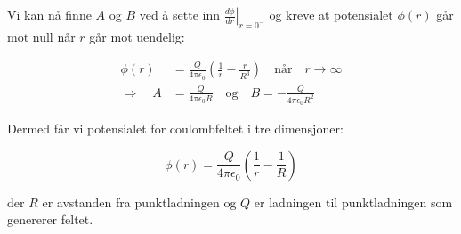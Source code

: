 Vi kan nå finne $A$ og $B$ ved å sette inn $\left.\frac{d\phi}{dr}\right|_{r=0^-}$ og kreve at potensialet $\phi(r)$ går mot null når $r$ går mot uendelig:
    
\begin{align*}
    \phi(r) &= \frac{Q}{4\pi\epsilon_0}\left(\frac{1}{r} - \frac{r}{R^3}\right) \quad \text{når} \quad r \rightarrow \infty \\
    \Rightarrow \quad A &= \frac{Q}{4\pi\epsilon_0R} \quad \text{og} \quad B = -\frac{Q}{4\pi\epsilon_0R^2}
\end{align*}
    
Dermed får vi potensialet for coulombfeltet i tre dimensjoner:
    
\begin{equation*}
    \phi(r) = \frac{Q}{4\pi\epsilon_0}\left(\frac{1}{r} - \frac{1}{R}\right)
\end{equation*}

der $R$ er avstanden fra punktladningen og $Q$ er ladningen til punktladningen som genererer feltet.
